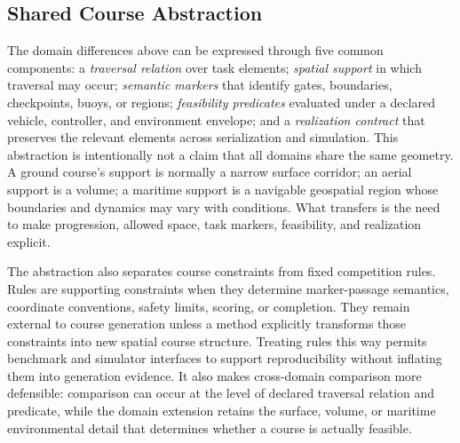\subsection{Shared Course Abstraction}

The domain differences above can be expressed through five common components:
a \emph{traversal relation} over task elements; \emph{spatial support} in
which traversal may occur; \emph{semantic markers} that identify gates,
boundaries, checkpoints, buoys, or regions; \emph{feasibility predicates}
evaluated under a declared vehicle, controller, and environment envelope; and a
\emph{realization contract} that preserves the relevant elements across
serialization and simulation.
This abstraction is intentionally not a claim that all domains share the same
geometry.  A ground course's support is normally a narrow surface corridor; an
aerial support is a volume; a maritime support is a navigable geospatial region
whose boundaries and dynamics may vary with conditions.  What transfers is the
need to make progression, allowed space, task markers, feasibility, and
realization explicit.

The abstraction also separates course constraints from fixed competition rules.
Rules are supporting constraints when they determine marker-passage semantics,
coordinate conventions, safety limits, scoring, or completion.  They remain
external to course generation unless a method explicitly transforms those
constraints into new spatial course structure.  Treating rules this way permits
benchmark and simulator interfaces to support reproducibility without inflating
them into generation evidence.  It also makes cross-domain comparison more
defensible: comparison can occur at the level of declared traversal relation and
predicate, while the domain extension retains the surface, volume, or maritime
environmental detail that determines whether a course is actually feasible.
